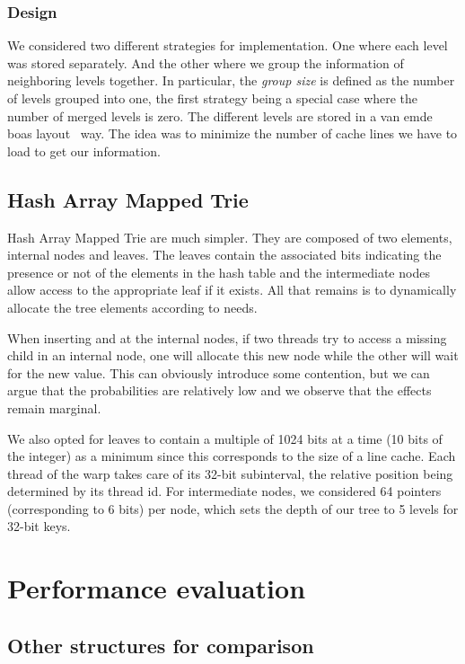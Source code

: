 \documentclass[conference]{IEEEtran}
\begin{document}
\subsubsection{Design}

We considered two different strategies for implementation. One where each level was stored separately. And the other where we group the information of neighboring levels together. In particular, the \textit{group size} is defined as the number of levels grouped into one, the first strategy being a special case where the number of merged levels is zero. The different levels are stored in a van emde boas layout~\cite{brodal2002cache} way. The idea was to minimize the number of cache lines we have to load to get our information.

\subsection{Hash Array Mapped Trie}

Hash Array Mapped Trie are much simpler. They are composed of two elements, internal nodes and leaves. The leaves contain the associated bits indicating the presence or not of the elements in the hash table and the intermediate nodes allow access to the appropriate leaf if it exists. All that remains is to dynamically allocate the tree elements according to needs.

When inserting and at the internal nodes, if two threads try to access a missing child in an internal node, one will allocate this new node while the other will wait for the new value. This can obviously introduce some contention, but we can argue that the probabilities are relatively low and we observe that the effects remain marginal.

We also opted for leaves to contain a multiple of 1024 bits at a time (10 bits of the integer) as a minimum since this corresponds to the size of a line cache. Each thread of the warp takes care of its 32-bit subinterval, the relative position being determined by its thread id. For intermediate nodes, we considered 64 pointers (corresponding to 6 bits) per node, which sets the depth of our tree to 5 levels for 32-bit keys.

\section{Performance evaluation}

\subsection{Other structures for comparison}
\end{document}

